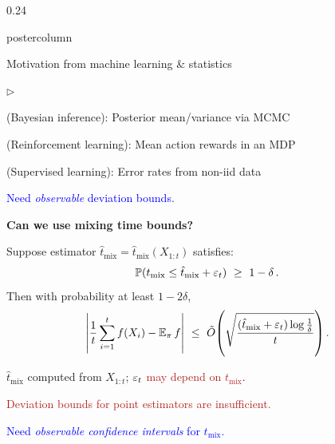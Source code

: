 \documentclass[notheorems,final]{beamer}
\newcommand{\compresslist}{%
  \setlength{\itemsep}{1pt}%
  \setlength{\parskip}{0pt}%
  \setlength{\parsep}{0pt}%
  \setlength{\leftmargin}{0.7cm}%
}
\newcommand{\BLUE}[1]{\textcolor{blue}{#1}}
\newcommand{\FIREBRICK}[1]{\textcolor{firebrick}{#1}}
\newcommand\tmix{\ensuremath{t_{\operatorname{mix}}}}
\newcommand\tmixhat{\ensuremath{\hat{t}_{\operatorname{mix}}}}
\begin{document}
\begin{frame}{}
\begin{columns}
\begin{column}{0.24\textwidth}
\begin{beamercolorbox}[center,wd=\textwidth]{postercolumn}
\begin{minipage}[T]{.95\textwidth}
{\begin{block}{Motivation from machine learning \& statistics}
                \medskip
                \begin{list}{$\triangleright$}\compresslist
                  \item {\small(Bayesian inference)}:
                    Posterior mean/variance via MCMC

                  \item {\small(Reinforcement learning)}:
                    Mean action rewards in an MDP

                  \item {\small(Supervised learning)}:
                    Error rates from non-iid data

                \end{list}

                \medskip
                \begin{center}
                  \BLUE{%
                    Need \emph{observable} deviation bounds.
                  }
                \end{center}

                \bigskip
                \textbf{Can we use mixing time bounds?}

                \medskip
                Suppose estimator $\tmixhat = \tmixhat(X_{1:t})$ satisfies:
                \[
                  \P(\tmix \leq \tmixhat + \veps_t)
                  \ \geq \
                  1-\delta
                  \,.
                \]
                Then with probability at least $1-2\delta$,
                \[
                  \Abs{
                    \frac1t\sum_{i=1}^t f(X_i)
                    -
                    \E_\pi f
                  }
                  \ \leq \
                  \tilde O\Parens{
                    \sqrt{
                      \frac{\parens{\tmixhat + \veps_t}
                      \log\frac1\delta}{t}
                    }
                  }
                  \,.
                \]

                $\tmixhat$ computed from $X_{1:t}$;
                \FIREBRICK{$\varepsilon_t$ may depend on $\tmix$}.

                \begin{center}
                  \FIREBRICK{%
                    Deviation bounds for point estimators are insufficient.%
                  }

                  \medskip
                  \BLUE{%
                    Need \emph{observable confidence intervals} for $\tmix$.%
                  }
                \end{center}




\end{block}}
\end{minipage}
\end{beamercolorbox}
\end{column}
\end{columns}
\end{frame}
\end{document}
